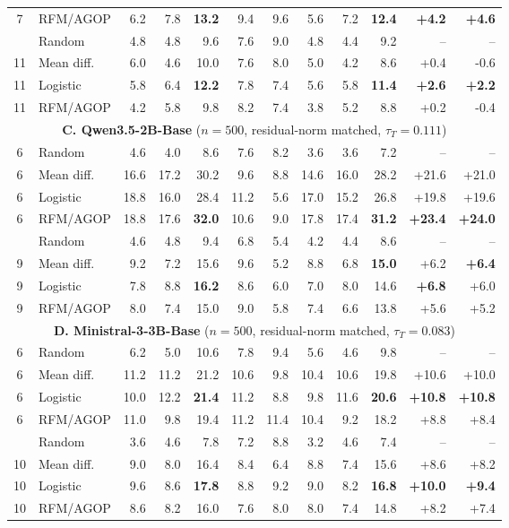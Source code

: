 \begin{table}[!t]
\begin{tabular*}{\textwidth}{@{\extracolsep{\fill}}clrrrrrrrrrr@{}}
7 & RFM/AGOP & 6.2 & 7.8 & \textbf{13.2} & 9.4 & 9.6 & 5.6 & 7.2 & \textbf{12.4} & \textbf{+4.2} & \textbf{+4.6} \\
\addlinespace[0.35pt]
11 & Random & 4.8 & 4.8 & 9.6 & 7.6 & 9.0 & 4.8 & 4.4 & 9.2 & -- & -- \\
11 & Mean diff. & 6.0 & 4.6 & 10.0 & 7.6 & 8.0 & 5.0 & 4.2 & 8.6 & +0.4 & -0.6 \\
11 & Logistic & 5.8 & 6.4 & \textbf{12.2} & 7.8 & 7.4 & 5.6 & 5.8 & \textbf{11.4} & \textbf{+2.6} & \textbf{+2.2} \\
11 & RFM/AGOP & 4.2 & 5.8 & 9.8 & 8.2 & 7.4 & 3.8 & 5.2 & 8.8 & +0.2 & -0.4 \\
\midrule
\multicolumn{12}{c}{\textbf{C. Qwen3.5-2B-Base} \quad ($n=500$, residual-norm matched, $\tau_T=0.111$)} \\
\cmidrule(lr){1-12}
6 & Random & 4.6 & 4.0 & 8.6 & 7.6 & 8.2 & 3.6 & 3.6 & 7.2 & -- & -- \\
6 & Mean diff. & 16.6 & 17.2 & 30.2 & 9.6 & 8.8 & 14.6 & 16.0 & 28.2 & +21.6 & +21.0 \\
6 & Logistic & 18.8 & 16.0 & 28.4 & 11.2 & 5.6 & 17.0 & 15.2 & 26.8 & +19.8 & +19.6 \\
6 & RFM/AGOP & 18.8 & 17.6 & \textbf{32.0} & 10.6 & 9.0 & 17.8 & 17.4 & \textbf{31.2} & \textbf{+23.4} & \textbf{+24.0} \\
\addlinespace[0.35pt]
9 & Random & 4.6 & 4.8 & 9.4 & 6.8 & 5.4 & 4.2 & 4.4 & 8.6 & -- & -- \\
9 & Mean diff. & 9.2 & 7.2 & 15.6 & 9.6 & 5.2 & 8.8 & 6.8 & \textbf{15.0} & +6.2 & \textbf{+6.4} \\
9 & Logistic & 7.8 & 8.8 & \textbf{16.2} & 8.6 & 6.0 & 7.0 & 8.0 & 14.6 & \textbf{+6.8} & +6.0 \\
9 & RFM/AGOP & 8.0 & 7.4 & 15.0 & 9.0 & 5.8 & 7.4 & 6.6 & 13.8 & +5.6 & +5.2 \\
\midrule
\multicolumn{12}{c}{\textbf{D. Ministral-3-3B-Base} \quad ($n=500$, residual-norm matched, $\tau_T=0.083$)} \\
\cmidrule(lr){1-12}
6 & Random & 6.2 & 5.0 & 10.6 & 7.8 & 9.4 & 5.6 & 4.6 & 9.8 & -- & -- \\
6 & Mean diff. & 11.2 & 11.2 & 21.2 & 10.6 & 9.8 & 10.4 & 10.6 & 19.8 & +10.6 & +10.0 \\
6 & Logistic & 10.0 & 12.2 & \textbf{21.4} & 11.2 & 8.8 & 9.8 & 11.6 & \textbf{20.6} & \textbf{+10.8} & \textbf{+10.8} \\
6 & RFM/AGOP & 11.0 & 9.8 & 19.4 & 11.2 & 11.4 & 10.4 & 9.2 & 18.2 & +8.8 & +8.4 \\
\addlinespace[0.35pt]
10 & Random & 3.6 & 4.6 & 7.8 & 7.2 & 8.8 & 3.2 & 4.6 & 7.4 & -- & -- \\
10 & Mean diff. & 9.0 & 8.0 & 16.4 & 8.4 & 6.4 & 8.8 & 7.4 & 15.6 & +8.6 & +8.2 \\
10 & Logistic & 9.6 & 8.6 & \textbf{17.8} & 8.8 & 9.2 & 9.0 & 8.2 & \textbf{16.8} & \textbf{+10.0} & \textbf{+9.4} \\
10 & RFM/AGOP & 8.6 & 8.2 & 16.0 & 7.6 & 8.0 & 8.0 & 7.4 & 14.8 & +8.2 & +7.4 \\
\bottomrule
\end{tabular*}

\end{table}
